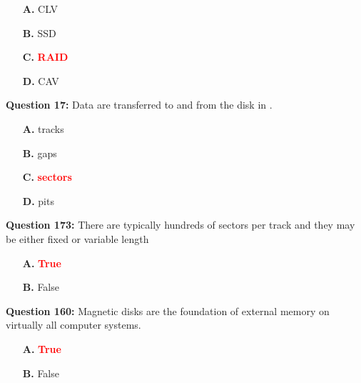 \documentclass[12pt,a4paper]{article}
\begin{document}
\begin{itemize}
    \item[\textbf{A.}] CLV
    \item[\textbf{B.}] SSD
    \item[\textbf{C.}] \textcolor{red}{\textbf{RAID}}
    \item[\textbf{D.}] CAV
\end{itemize}

\vspace{0.5cm}

\vspace{0.5cm}

\textbf{Question 17:} Data are transferred to and from the disk in \underline{\hspace{1.5cm}}.

\begin{itemize}
    \item[\textbf{A.}] tracks
    \item[\textbf{B.}] gaps
    \item[\textbf{C.}] \textcolor{red}{\textbf{sectors}}
    \item[\textbf{D.}] pits
\end{itemize}

\vspace{0.5cm}

\vspace{0.5cm}

\textbf{Question 173:} There are typically hundreds of sectors per track and they may be either fixed or variable length

\begin{itemize}
    \item[\textbf{A.}] \textcolor{red}{\textbf{True}}
    \item[\textbf{B.}] False
\end{itemize}

\vspace{0.5cm}

\vspace{0.5cm}

\textbf{Question 160:} Magnetic disks are the foundation of external memory on virtually all computer systems.

\begin{itemize}
    \item[\textbf{A.}] \textcolor{red}{\textbf{True}}
    \item[\textbf{B.}] False
\end{itemize}

\vspace{0.5cm}
\end{document}
